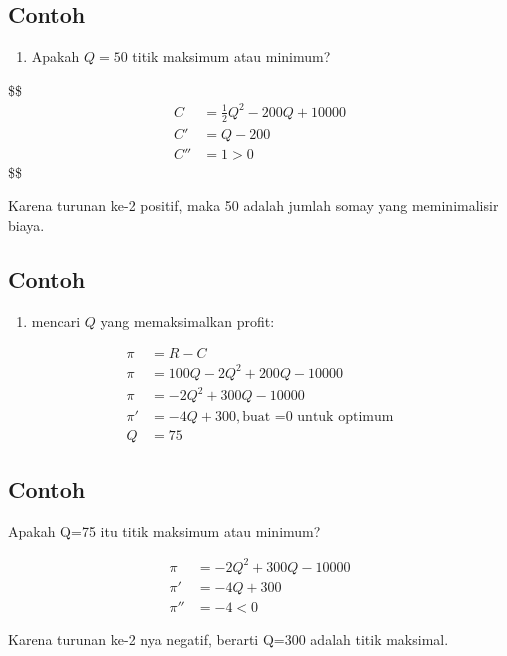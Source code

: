 \documentclass[
  letterpaper,
  DIV=11,
  numbers=noendperiod]{scrartcl}
\providecommand{\tightlist}{%
  \setlength{\itemsep}{0pt}\setlength{\parskip}{0pt}}\usepackage{longtable,booktabs,array}
\begin{document}
\subsection{Contoh}\label{contoh-9}

\begin{enumerate}
\def\labelenumi{\alph{enumi}.}
\setcounter{enumi}{1}
\tightlist
\item
  Apakah \(Q=50\) titik maksimum atau minimum?
\end{enumerate}

\$\$ \begin{align}
C&=\frac{1}{2}Q^2-200Q+10000 \\
C'&=Q-200 \\
C''&=1 >0

\end{align} \$\$

Karena turunan ke-2 positif, maka 50 adalah jumlah somay yang
meminimalisir biaya.

\subsection{Contoh}\label{contoh-10}

\begin{enumerate}
\def\labelenumi{\alph{enumi}.}
\setcounter{enumi}{2}
\tightlist
\item
  mencari \(Q\) yang memaksimalkan profit:
\end{enumerate}

\[
\begin{align}
\pi&=R-C \\
\pi&=100Q-2Q^2+200Q-10000 \\
\pi&=-2Q^2+300Q-10000 \\
\pi'&=-4Q+300,\text{buat =0 untuk optimum} \\
Q&=75
\end{align}
\]

\subsection{Contoh}\label{contoh-11}

Apakah Q=75 itu titik maksimum atau minimum?

\[
\begin{align}
\pi&=-2Q^2+300Q-10000 \\
\pi'&=-4Q+300 \\
\pi''&=-4<0
\end{align}
\]

Karena turunan ke-2 nya negatif, berarti Q=300 adalah titik maksimal.
\end{document}
